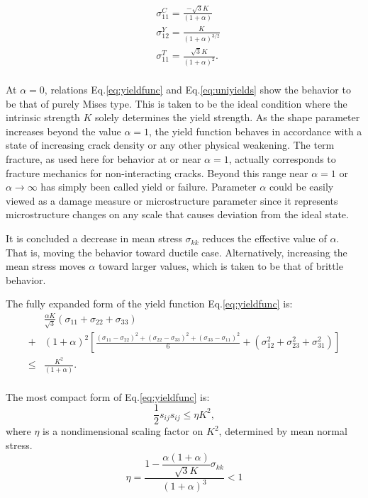 \begin{equation}
\begin{split}
&\sigma_{11}^C=\frac{-\sqrt{3}K}{(1+\alpha)}\\
&\sigma_{12}^Y=\frac{K}{(1+\alpha)^{3/2}} \\
&\sigma_{11}^T=\frac{\sqrt{3}K}{(1+\alpha)^2}.\\
\end{split}
\label{eq:uniyields}
\end{equation}

At $\alpha=0$, relations Eq.\eqref{eq:yieldfunc} and Eq.\eqref{eq:uniyields} show the behavior to be that of purely Mises type. This is taken to be the ideal condition where the intrinsic strength $K$ solely determines the yield strength. As the shape parameter increases beyond the value $\alpha=1$, the yield function behaves in accordance with  a state of increasing crack density or any other physical weakening. The term fracture, as used here for behavior at or near $\alpha=1$, actually corresponds to fracture mechanics for non-interacting cracks. Beyond this range near $\alpha=1$ or $\alpha\to\infty$ has simply been called yield or failure. Parameter $\alpha$ could be easily viewed as a damage measure or microstructure parameter since it represents microstructure changes on any scale that causes deviation from the ideal state. 

It is concluded a decrease in mean stress $\sigma_{kk}$ reduces the effective value of $\alpha$. That is, moving the behavior toward ductile case. Alternatively, increasing the mean stress moves $\alpha$ toward larger values, which is taken to be that of brittle behavior.

The fully expanded form of the yield function Eq.\eqref{eq:yieldfunc} is:
\begin{equation}
\begin{split}
&\frac{\alpha K}{\sqrt{3}}(\sigma_{11}+\sigma_{22}+\sigma_{33})\\
+&(1+\alpha)^2\left[\frac{(\sigma_{11}-\sigma_{22})^2+(\sigma_{22}-\sigma_{33})^2+(\sigma_{33}-\sigma_{11})^2}{6}
+(\sigma_{12}^2+\sigma_{23}^2+\sigma_{31}^2) \right]\\
\leqslant&\frac{K^2}{(1+\alpha)}.\\
\end{split}
\end{equation}

The most compact form of Eq.\eqref{eq:yieldfunc} is:
\begin{equation}
\frac{1}{2}s_{ij}s_{ij}\leqslant\eta K^2,
\end{equation}
where $\eta$ is a nondimensional scaling factor on $K^2$, determined by mean normal stress.
$$\eta=\frac{1-\dfrac{\alpha(1+\alpha)}{\sqrt{3}K}\sigma_{kk}}{(1+\alpha)^3}<1$$


